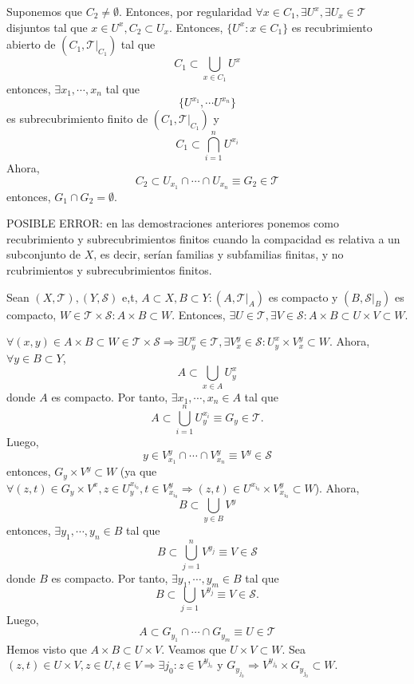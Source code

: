 \begin{dem}
  Suponemos que $C_{2} \neq \emptyset$. Entonces, por regularidad $\forall x \in C_{1}, \exists U^{x}, \exists U_{x} \in \mathcal{T}$ disjuntos tal que $x \in U^{x}, C_{2} \subset U_{x}$. Entonces, $\{ U^{x} :  x \in C_{1} \}$ es recubrimiento abierto de $( C_{1}, \mathcal{T}|_{C_{1}})$ tal que
  \[ 
    C_{1} \subset \bigcup_{x \in C_{1}} U^{x}
  \] 
  entonces, $\exists x_{1}, \cdots, x_{n}$ tal que
  \[
    \{ U^{x_{1}}, \cdots U^{x_{n}} \}
  \]
  es subrecubrimiento finito de $( C_{1}, \mathcal{T}|_{C_1})$ y
  \[ 
    C_{1} \subset \bigcap_{i = 1}^{n} U^{x_{i}}
  \] 
  Ahora, 
  \[ 
     C_{2} \subset U_{x_{1}} \cap \cdots \cap U_{x_{n}} \equiv G_{2} \in \mathcal{T} 
  \] 
  entonces, $G_{1} \cap G_{2} = \emptyset$.
\end{dem}

POSIBLE ERROR: en las demostraciones anteriores ponemos como recubrimiento y subrecubrimientos finitos cuando la compacidad es relativa a un subconjunto de $X$, es decir, serían familias y subfamilias finitas, y no rcubrimientos y subrecubrimientos finitos.

\begin{prop}
  Sean $( X, \mathcal{T} ), ( Y, \mathcal{S} )$ e,t, $A \subset X, B \subset Y : ( A, \mathcal{T}|_{A})$ es compacto y $( B, \mathcal{S}|_{B})$ es compacto, $W \in \mathcal{T} \times \mathcal{S} : A \times B \subset W$. Entonces, $\exists U \in \mathcal{T}, \exists V \in \mathcal{S} : A \times B \subset U \times V \subset W$.
\end{prop}

\begin{dem}
  $\forall (x, y ) \in A \times B \subset W \in \mathcal{T} \times \mathcal{S} \Rightarrow \exists U^{x}_{y} \in \mathcal{T}, \exists V^{y}_{x} \in \mathcal{S} : U^{x}_{y} \times V^{y}_{x} \subset W$. Ahora, $\forall y \in B \subset Y$,
  \[ 
    A \subset \bigcup_{x \in A} U^{x}_{y}
  \] 
  donde $A$ es compacto. Por tanto, $\exists x_{1}, \cdots, x_{n} \in A$ tal que
  \[ 
    A \subset \bigcup_{i = 1}^{n} U^{x_{i}}_{y} \equiv G_{y} \in \mathcal{T}.
  \] 
  Luego, 
  \[ 
    y \in V^{y}_{x_{1}} \cap \cdots \cap V^{y}_{x_{n}} \equiv V^{y} \in \mathcal{S} 
  \] 
  entonces, $G_{y} \times V^{y} \subset W$ (ya que $\forall (z,t) \in G_{y} \times V^{x}, z \in U^{x_{i_{0}}}_{y}, t \in V^{y}_{x_{i_{0}}} \Rightarrow (z, t) \in U^{x_{i_{0}}} \times V^{y}_{x_{i_{0}}} \subset W$). Ahora,
  \[ 
    B \subset \bigcup_{y \in B} V^{y} 
  \] 
  entonces, $\exists y_{1}, \cdots, y_{n} \in B$ tal que
  \[ 
    B \subset \bigcup_{j=1}^{n} V^{y_{j}} \equiv V \in \mathcal{S}
  \] 
  donde $B$ es compacto. Por tanto, $\exists y_{1}, \cdots, y_{m} \in B$ tal que
  \[ 
    B \subset \bigcup_{j =1} V^{y_{j}} \equiv V \in \mathcal{S}.
  \] 
  Luego, 
  \[ 
    A \subset G_{y_{1}} \cap \cdots \cap G_{y_{m}} \equiv U \in \mathcal{T} 
  \] 
  Hemos visto que $A \times B \subset U \times V$. Veamos que $U \times V \subset W$. Sea $ (z, t) \in U \times V, z \in U, t \in V \Rightarrow \exists j_{0} : z \in V^{y_{j_{0}}}$ y $G_{y_{j_{0}}} \Rightarrow V^{y_{j_{0}}} \times G_{y_{j_{0}}} \subset W$.
\end{dem}

